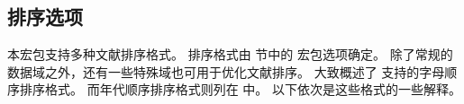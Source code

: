 \subsection{排序选项}%
\label{use:srt}


本宏包支持多种文献排序格式。
排序格式由  节中的  宏包选项确定。
除了常规的数据域之外，还有一些特殊域也可用于优化文献排序。
 大致概述了 \biblatex 支持的字母顺序排序格式。
而年代顺序排序格式则列在  中。
以下依次是这些格式的一些解释。


